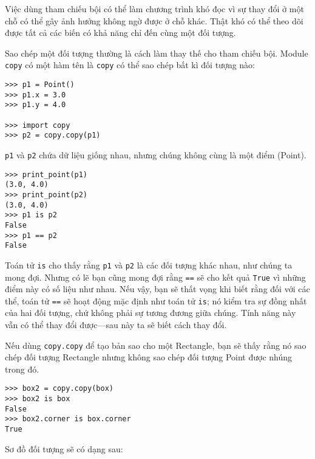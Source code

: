 \documentclass[11pt]{book}
\begin{document}

Việc dùng tham chiếu bội có thể làm chương trình khó đọc vì sự
thay đổi ở một chỗ có thể gây ảnh hưởng không ngờ được ở chỗ khác.
Thật khó có thể theo dõi được tất cả các biến có khả năng chỉ đến
cùng một đối tượng.


Sao chép một đối tượng thường là cách làm thay thế cho tham chiếu bội.
Module {\tt copy} có một hàm tên là {\tt copy} có thể
sao chép bất kì đối tượng nào:

\beforeverb
\begin{verbatim}
>>> p1 = Point()
>>> p1.x = 3.0
>>> p1.y = 4.0

>>> import copy
>>> p2 = copy.copy(p1)
\end{verbatim}
\afterverb
%
{\tt p1} và {\tt p2} chứa dữ liệu giống nhau, nhưng chúng không cùng là 
một điểm (Point).

\beforeverb
\begin{verbatim}
>>> print_point(p1)
(3.0, 4.0)
>>> print_point(p2)
(3.0, 4.0)
>>> p1 is p2
False
>>> p1 == p2
False
\end{verbatim}
\afterverb
%
Toán tử {\tt is} cho thấy rằng {\tt p1} và {\tt p2} là các đối tượng khác nhau,
như chúng ta mong đợi. Nhưng có lẽ bạn cũng mong đợi rằng 
{\tt ==} sẽ cho kết quả {\tt True} vì những điểm này có số liệu như nhau.
Nếu vậy, bạn sẽ thất vọng khi biết rằng đối với các thể,
toán tử {\tt ==} sẽ hoạt động mặc định như toán tử
{\tt is}; nó kiểm tra sự đồng nhất của hai đối tượng, chứ không phải sự 
tương đương giữa chúng. Tính năng này vẫn có thể thay đổi được---sau này
ta sẽ biết cách thay đổi.


Nếu dùng {\tt copy.copy} để tạo bản sao cho một Rectangle, bạn sẽ thấy rằng
nó sao chép đối tượng Rectangle nhưng không sao chép đối tượng Point được
nhúng trong đó.


\beforeverb
\begin{verbatim}
>>> box2 = copy.copy(box)
>>> box2 is box
False
>>> box2.corner is box.corner
True
\end{verbatim}
\afterverb
%
Sơ đồ đối tượng sẽ có dạng sau:

\end{document}
